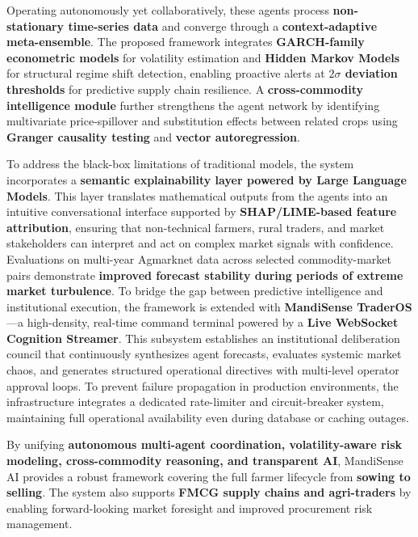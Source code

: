 \documentclass[12pt,a4paper]{report}
\begin{document}
\noindent
Operating autonomously yet collaboratively, these agents process \textbf{non-stationary time-series data} and converge through a \textbf{context-adaptive meta-ensemble}. The proposed framework integrates \textbf{GARCH-family econometric models} for volatility estimation and \textbf{Hidden Markov Models} for structural regime shift detection, enabling proactive alerts at \textbf{$2\sigma$ deviation thresholds} for predictive supply chain resilience. A \textbf{cross-commodity intelligence module} further strengthens the agent network by identifying multivariate price-spillover and substitution effects between related crops using \textbf{Granger causality testing} and \textbf{vector autoregression}.

\vspace{0.6em}

\noindent
To address the black-box limitations of traditional models, the system incorporates a \textbf{semantic explainability layer powered by Large Language Models}. This layer translates mathematical outputs from the agents into an intuitive conversational interface supported by \textbf{SHAP/LIME-based feature attribution}, ensuring that non-technical farmers, rural traders, and market stakeholders can interpret and act on complex market signals with confidence. Evaluations on multi-year Agmarknet data across selected commodity-market pairs demonstrate \textbf{improved forecast stability during periods of extreme market turbulence}. To bridge the gap between predictive intelligence and institutional execution, the framework is extended with \textbf{MandiSense TraderOS}—a high-density, real-time command terminal powered by a \textbf{Live WebSocket Cognition Streamer}. This subsystem establishes an institutional deliberation council that continuously synthesizes agent forecasts, evaluates systemic market chaos, and generates structured operational directives with multi-level operator approval loops. To prevent failure propagation in production environments, the infrastructure integrates a dedicated rate-limiter and circuit-breaker system, maintaining full operational availability even during database or caching outages.

\vspace{0.6em}

\noindent
By unifying \textbf{autonomous multi-agent coordination, volatility-aware risk modeling, cross-commodity reasoning, and transparent AI}, MandiSense AI provides a robust framework covering the full farmer lifecycle from \textbf{sowing to selling}. The system also supports \textbf{FMCG supply chains and agri-traders} by enabling forward-looking market foresight and improved procurement risk management.
\clearpage
\end{document}
